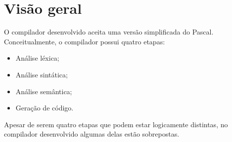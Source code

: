 \section{Visão geral}
O compilador desenvolvido aceita uma versão simplificada do Pascal.
Conceitualmente, o compilador possui quatro etapas:

\begin{itemize}
	\item Análise léxica;
	\item Análise sintática;
	\item Análise semântica;
	\item Geração de código.
\end{itemize}

Apesar de serem quatro etapas que podem estar logicamente distintas, no
compilador desenvolvido algumas delas estão sobrepostas.
